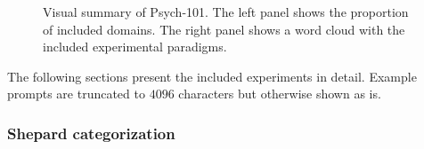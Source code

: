 \documentclass[pdflatex,sn-nature]{sn-jnl}%
\theoremstyle{thmstyleone}%
\theoremstyle{thmstyletwo}%
\theoremstyle{thmstylethree}%
\begin{document}
\begin{figure}[H]
    \centering
    \caption{Visual summary of Psych-101. The left panel shows the proportion of included domains. The right panel shows a word cloud with the included experimental paradigms.}
    \label{fig:fig5}
\end{figure}

\noindent The following sections present the included experiments in detail. Example prompts are truncated to $4096$ characters but otherwise shown as is.

\subsubsection*{Shepard categorization}
\end{document}
